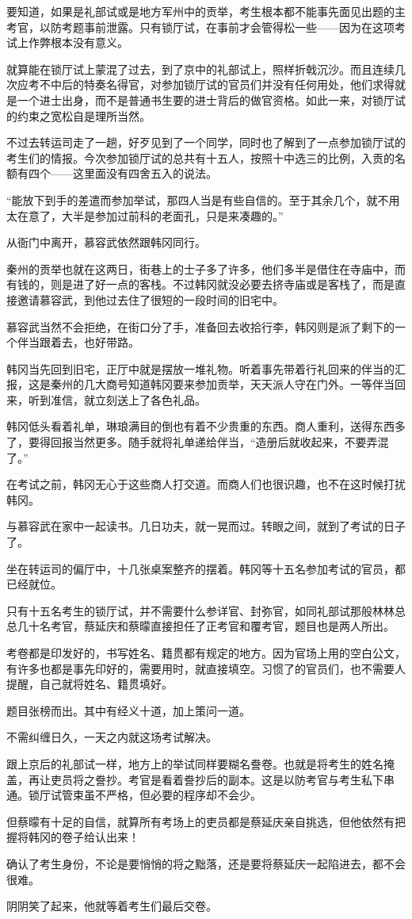要知道，如果是礼部试或是地方军州中的贡举，考生根本都不能事先面见出题的主考官，以防考题事前泄露。只有锁厅试，在事前才会管得松一些——因为在这项考试上作弊根本没有意义。

就算能在锁厅试上蒙混了过去，到了京中的礼部试上，照样折戟沉沙。而且连续几次应考不中后的特奏名得官，对参加锁厅试的官员们并没有任何用处，他们求得就是一个进士出身，而不是普通书生要的进士背后的做官资格。如此一来，对锁厅试的约束之宽松自是理所当然。

不过去转运司走了一趟，好歹见到了一个同学，同时也了解到了一点参加锁厅试的考生们的情报。今次参加锁厅试的总共有十五人，按照十中选三的比例，入贡的名额有四个——这里面没有四舍五入的说法。

“能放下到手的差遣而参加举试，那四人当是有些自信的。至于其余几个，就不用太在意了，大半是参加过前科的老面孔，只是来凑趣的。”

从衙门中离开，慕容武依然跟韩冈同行。

秦州的贡举也就在这两日，街巷上的士子多了许多，他们多半是借住在寺庙中，而有钱的，则是进了好一点的客栈。不过韩冈就没必要去挤寺庙或是客栈了，而是直接邀请慕容武，到他过去住了很短的一段时间的旧宅中。

慕容武当然不会拒绝，在街口分了手，准备回去收拾行李，韩冈则是派了剩下的一个伴当跟着去，也好带路。

韩冈当先回到旧宅，正厅中就是摆放一堆礼物。听着事先带着行礼回来的伴当的汇报，这是秦州的几大商号知道韩冈要来参加贡举，天天派人守在门外。一等伴当回来，听到准信，就立刻送上了各色礼品。

韩冈低头看着礼单，琳琅满目的倒也有着不少贵重的东西。商人重利，送得东西多了，要得回报当然更多。随手就将礼单递给伴当，“造册后就收起来，不要弄混了。”

在考试之前，韩冈无心于这些商人打交道。而商人们也很识趣，也不在这时候打扰韩冈。

与慕容武在家中一起读书。几日功夫，就一晃而过。转眼之间，就到了考试的日子了。

坐在转运司的偏厅中，十几张桌案整齐的摆着。韩冈等十五名参加考试的官员，都已经就位。

只有十五名考生的锁厅试，并不需要什么参详官、封弥官，如同礼部试那般林林总总几十名考官，蔡延庆和蔡曚直接担任了正考官和覆考官，题目也是两人所出。

考卷都是印发好的，书写姓名、籍贯都有规定的地方。因为官场上用的空白公文，有许多也都是事先印好的，需要用时，就直接填空。习惯了的官员们，也不需要人提醒，自己就将姓名、籍贯填好。

题目张榜而出。其中有经义十道，加上策问一道。

不需纠缠日久，一天之内就这场考试解决。

跟上京后的礼部试一样，地方上的举试同样要糊名誊卷。也就是将考生的姓名掩盖，再让吏员将之誊抄。考官是看着誊抄后的副本。这是以防考官与考生私下串通。锁厅试管束虽不严格，但必要的程序却不会少。

但蔡曚有十足的自信，就算所有考场上的吏员都是蔡延庆亲自挑选，但他依然有把握将韩冈的卷子给认出来！

确认了考生身份，不论是要悄悄的将之黜落，还是要将蔡延庆一起陷进去，都不会很难。

阴阴笑了起来，他就等着考生们最后交卷。

